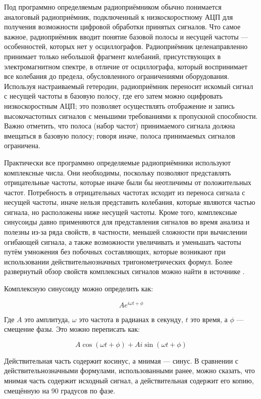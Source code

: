 \documentclass{report}
\begin{document}
Под программно определяемым радиоприёмником обычно понимается аналоговый радиоприёмник, подключенный к низкоскоростному АЦП для получения возможности цифровой обработки принятых сигналов. Что самое важное, радиоприёмник вводит понятие базовой полосы и несущей частоты --- особенностей, которых нет у осциллографов. Радиоприёмник целенаправленно принимает только небольшой фрагмент колебаний, присутствующих в электромагнитном спектре, в отличие от осциллографа, который воспринимает все колебания до предела, обусловленного ограничениями оборудования. Используя настраиваемый гетеродин, радиоприёмник переносит искомый сигнал с несущей частоты в базовую полосу, где его затем можно оцифровать низкоскоростным АЦП; это позволяет осуществлять отображение и запись высокочастотных сигналов с меньшими требованиями к пропускной способности. Важно отметить, что полоса (набор частот) принимаемого сигнала должна вмещаться в базовую полосу; говоря иначе, полоса принимаемых сигналов ограничена.

Практически все программно определяемые радиоприёмники используют комплексные числа. Они необходимы, поскольку позволяют представлять отрицательные частоты, которые иначе были бы неотличимы от положительных частот. Потребность в отрицательных частотах исходит из переноса сигнала с несущей частоты, иначе нельзя представить колебания, которые являются частью сигнала, но расположены ниже несущей частоты. Кроме того, комплексные синусоиды давно применяются для представления сигналов во время анализа и полезны из-за ряда свойств, в частности, меньшей сложности при вычислении огибающей сигнала, а также возможности увеличивать и уменьшать частоты путём умножения без побочных составляющих, которые возникают при использовании действительнозначных тригонометрических формул. Более развернутый обзор свойств комплексных сигналов можно найти в источнике \cite{iq_data}.

Комплексную синусоиду можно определить как:

\begin{equation}
A e^{i \omega t + \phi}
\end{equation}

Где $A$ это амплитуда, $\omega$ это частота в радианах в секунду, $t$ это время, а $\phi$ --- смещение фазы. Это можно переписать как:

\begin{equation}
A \cos(\omega t + \phi) + A i \sin(\omega t + \phi)
\end{equation}

Действительная часть содержит косинус, а мнимая --- синус. В сравнении с действительнозначными формулами, использованными ранее, можно сказать, что мнимая часть содержит исходный сигнал, а действительная содержит его копию, смещённую на 90 градусов по фазе.
\end{document}
